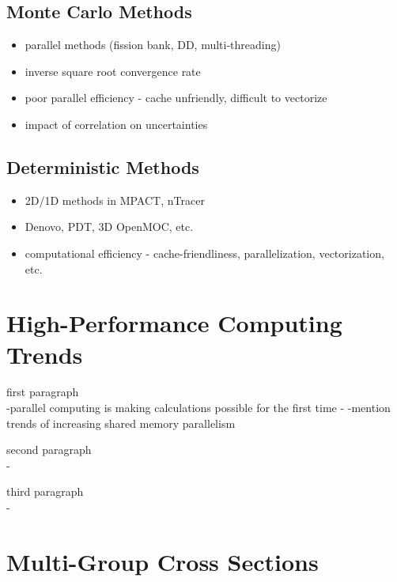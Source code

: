 \subsection{Monte Carlo Methods}
\label{subsec:chap1-monte-carlo}

\begin{itemize}[noitemsep]
  \item parallel methods (fission bank, DD, multi-threading)
  \item inverse square root convergence rate
  \item poor parallel efficiency - cache unfriendly, difficult to vectorize
  \item impact of correlation on uncertainties
\end{itemize}


\subsection{Deterministic Methods}
\label{subsec:chap1-deterministic}


\begin{itemize}[noitemsep]
  \item 2D/1D methods in MPACT, nTracer
  \item Denovo, PDT, 3D OpenMOC, etc.
  \item computational efficiency - cache-friendliness, parallelization, vectorization, etc.
\end{itemize}


\section{High-Performance Computing Trends}
\label{sec:chap1-hpc-trends}

first paragraph\\
-parallel computing is making calculations possible for the first time
-
-mention trends of increasing shared memory parallelism

second paragraph\\
-

third paragraph\\
-

\cite{Hunter_Sutton_2013}


\section{Multi-Group Cross Sections}
\label{sec:chap1-mgxs}

